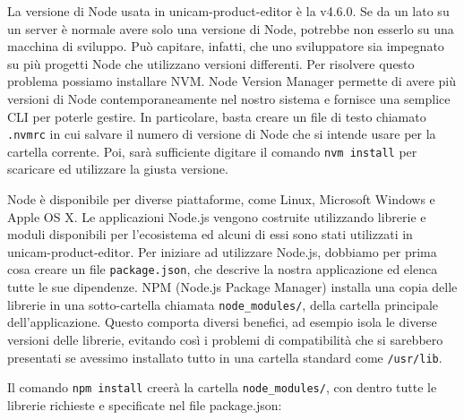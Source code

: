 La versione di Node usata in unicam-product-editor è la v4.6.0.
Se da un lato su un server è normale avere solo una versione di Node, potrebbe non esserlo su una macchina di sviluppo.
Può capitare, infatti, che uno sviluppatore sia impegnato su più progetti Node che utilizzano versioni differenti.
Per risolvere questo problema possiamo installare NVM.
Node Version Manager permette di avere più versioni di Node contemporaneamente nel nostro sistema e fornisce una semplice CLI per poterle gestire.
In particolare, basta creare un file di testo chiamato \texttt{.nvmrc} in cui salvare il numero di versione di Node che si intende usare per la cartella corrente.
Poi, sarà sufficiente digitare il comando \texttt{nvm install} per scaricare ed utilizzare la giusta versione.

Node è disponibile per diverse piattaforme, come Linux, Microsoft Windows e Apple OS X.
Le applicazioni Node.js vengono costruite utilizzando librerie e moduli disponibili per l'ecosistema ed alcuni di essi sono stati utilizzati in unicam-product-editor.
Per iniziare ad utilizzare Node.js, dobbiamo per prima cosa creare un file \texttt{package.json}, che descrive la nostra applicazione ed elenca tutte le sue dipendenze.
NPM (Node.js Package Manager) installa una copia delle librerie in una sotto-cartella chiamata \texttt{node\_modules/}, della cartella principale dell'applicazione. 
Questo comporta diversi benefici, ad esempio isola le diverse versioni delle librerie, evitando così i problemi di compatibilità che si sarebbero presentati se avessimo installato tutto in una cartella standard come \texttt{/usr/lib}.

Il comando \texttt{npm install} creerà la cartella \texttt{node\_modules/}, con dentro tutte le librerie richieste e specificate nel file package.json:

